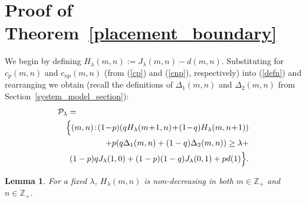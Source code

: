 \documentclass[conference]{IEEEtran}
\newtheorem{lemma}{Lemma}
\begin{document}
\section{Proof of Theorem~\ref{placement_boundary}}
\label{placement_boundary_appendix}
We begin by defining $H_{\lambda}(m,n):= J_{\lambda}(m,n)-d(m,n)$. Substituting for 
$c_p(m,n)$ and $c_{np}(m,n)$ 
(from (\ref{cp}) and (\ref{cnp}), respectively) into (\ref{defn}) and rearranging we obtain 
(recall the definitions of $\Delta_1(m,n)$ and $\Delta_2(m,n)$ from Section~\ref{system_model_section}):
\begin{eqnarray} \label{placement1}
\lefteqn{\mathcal{P}_\lambda=}\nonumber\\
&&\Big\{(m,n)\!:\!(1\!-\!p)(qH_\lambda(m\!+\!1,n)\!+\!(1\!-\!q)H_\lambda(m,n\!+\!1))\nonumber\\
&&+p(q\Delta_1(m,n)+(1-q)\Delta_2(m,n))\geq \lambda+ \\
&&(1-p)qJ_{\lambda}(1,0)+(1-p)(1-q)J_{\lambda}(0,1)+pd(1)\Big\}. \nonumber
\end{eqnarray}
\begin{lemma} 
\label{H}
For a fixed $\lambda$, $H_\lambda(m,n)$ is non-decreasing in both $m\in\mathbb{Z}_+$ and $n\in 
\mathbb{Z}_+$.
\end{lemma}
\end{document}

